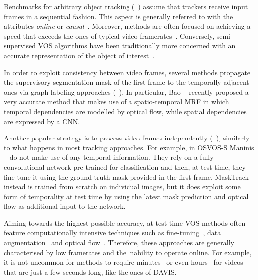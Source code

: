 \documentclass[10pt,twocolumn,letterpaper]{article}
\newcommand{\mypar}[1]{\smallskip\noindent {\bf #1}\enskip}
\begin{document}
\mypar{Semi-supervised video object segmentation.}
Benchmarks for arbitrary object tracking (\eg~\cite{smeulders2014visual,kristan2016visual,wu2013online}) assume that trackers receive input frames in a sequential fashion.
This aspect is generally referred to with the attributes \emph{online} or \emph{causal}~\cite{kristan2016visual}.
Moreover, methods are often focused on achieving a speed that exceeds the ones of typical video framerates~\cite{VOT2018}.
Conversely, semi-supervised VOS algorithms have been traditionally more concerned with an accurate representation of the object of interest~\cite{perazzi2017video,perazzi2016benchmark}.

In order to exploit consistency between video frames, several methods propagate the supervisory segmentation mask of the first frame to the temporally adjacent ones via graph labeling approaches (\eg~\cite{wen2015jots,perazzi2015fully,tsai2016video,marki2016bilateral,bao2018cnn}). 
In particular, Bao \etal~\cite{bao2018cnn} recently proposed a very accurate method that makes use of a spatio-temporal MRF in which temporal dependencies are modelled by optical flow, while spatial dependencies are expressed by a CNN.

Another popular strategy is to process video frames independently (\eg~\cite{maninis2017video,perazzi2017learning,voigtlaender2017online}), similarly to what happens in most tracking approaches.
For example, in OSVOS-S Maninis \etal~\cite{maninis2017video} do not make use of any temporal information.
They rely on a fully-convolutional network pre-trained for classification and then, at test time, they fine-tune it using the ground-truth mask provided in the first frame.
MaskTrack~\cite{perazzi2017learning} instead is trained from scratch on individual images, but it does exploit some form of temporality at test time by using the latest mask prediction and optical flow as additional input to the network.

Aiming towards the highest possible accuracy, at test time VOS methods often feature computationally intensive techniques such as fine-tuning~\cite{maninis2017video,perazzi2017learning,bao2018cnn,voigtlaender2017online}, data augmentation~\cite{LucidDataDreaming_CVPR17_workshops,li2018video} and optical flow~\cite{tsai2016video,bao2018cnn,perazzi2017learning,li2018video,cheng2018fast}.
Therefore, these approaches are generally characterised by low framerates and the inability to operate online.
For example, it is not uncommon for methods to require minutes~\cite{perazzi2017learning,cheng2017segflow} or even hours~\cite{tsai2016video,bao2018cnn} for videos that are just a few seconds long, like the ones of DAVIS.
\end{document}
